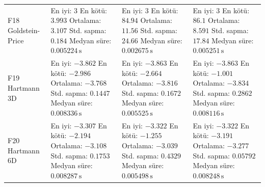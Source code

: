 \begin{longtable}{@{}p{2.25cm}p{4.25cm}p{4.25cm}p{4.25cm}@{}}
F18 Goldstein-Price & \makecell[l]{En iyi: $3$\\ En kötü: $3.993$\\ Ortalama: $3.107$\\ Std. sapma: $0.184$\\ Medyan süre: $0.005224\,\mathrm{s}$} & \makecell[l]{En iyi: $3$\\ En kötü: $84.94$\\ Ortalama: $11.56$\\ Std. sapma: $24.66$\\ Medyan süre: $0.002675\,\mathrm{s}$} & \makecell[l]{En iyi: $3$\\ En kötü: $86.1$\\ Ortalama: $8.591$\\ Std. sapma: $17.84$\\ Medyan süre: $0.005251\,\mathrm{s}$} \\
F19 Hartmann 3D & \makecell[l]{En iyi: $-3.862$\\ En kötü: $-2.986$\\ Ortalama: $-3.768$\\ Std. sapma: $0.1447$\\ Medyan süre: $0.008336\,\mathrm{s}$} & \makecell[l]{En iyi: $-3.863$\\ En kötü: $-2.664$\\ Ortalama: $-3.816$\\ Std. sapma: $0.1672$\\ Medyan süre: $0.005525\,\mathrm{s}$} & \makecell[l]{En iyi: $-3.863$\\ En kötü: $-1.001$\\ Ortalama: $-3.834$\\ Std. sapma: $0.2862$\\ Medyan süre: $0.008116\,\mathrm{s}$} \\
F20 Hartmann 6D & \makecell[l]{En iyi: $-3.307$\\ En kötü: $-2.194$\\ Ortalama: $-3.108$\\ Std. sapma: $0.1753$\\ Medyan süre: $0.008287\,\mathrm{s}$} & \makecell[l]{En iyi: $-3.322$\\ En kötü: $-1.255$\\ Ortalama: $-3.039$\\ Std. sapma: $0.4329$\\ Medyan süre: $0.005498\,\mathrm{s}$} & \makecell[l]{En iyi: $-3.322$\\ En kötü: $-3.191$\\ Ortalama: $-3.277$\\ Std. sapma: $0.05792$\\ Medyan süre: $0.008248\,\mathrm{s}$} \\

\end{longtable}

